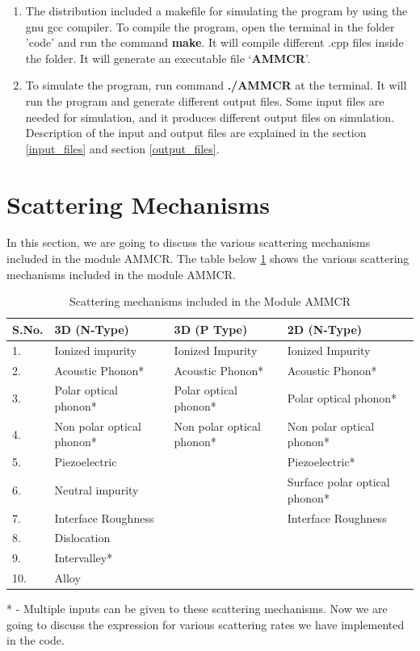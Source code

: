 \documentclass[12pt]{article}
\begin{document}
\begin{enumerate}
\item The distribution included a makefile for simulating the program by using the gnu gcc compiler.  To compile the program, open the terminal in the folder 'code' and run the command \textbf{make}. It will compile different .cpp files inside the folder. It will generate an executable file \lq \textbf{AMMCR}\rq .

\item To simulate the program, run command \textbf{./AMMCR} at the terminal. It will run the program and generate different output files. Some input files are needed for simulation, and it produces different output files on simulation. Description of the input and output files are explained in the section \ref{input_files} and section \ref{output_files}. 

\end{enumerate} 


\section{Scattering Mechanisms} \label{scattering}
In this section, we are going to discuss the various scattering mechanisms included in the module AMMCR. 
The table below \ref{scattering} shows the various scattering mechanisms included in the module AMMCR.

\begin{table} [H]
\caption{ Scattering mechanisms included in the Module AMMCR}
\label{scattering_table}
\begin{tabular}{|l|l|l|l|}
\hline
S.No. & 3D (N-Type) & 3D (P Type) & 2D (N-Type)   \\
\hline                                      
1. & Ionized impurity   &  Ionized Impurity & Ionized Impurity \\
\hline
2. & Acoustic Phonon*   &  Acoustic Phonon* &  Acoustic Phonon*  \\
\hline
3. & Polar optical phonon*    &  Polar optical phonon* &  Polar optical phonon* \\
\hline
4. & Non polar optical phonon*   &  Non polar optical phonon*  &  Non polar optical phonon* \\
\hline
5. & Piezoelectric & & Piezoelectric* \\
\hline
6. & Neutral impurity & & Surface polar optical phonon* \\
\hline
7. & Interface Roughness & & Interface Roughness \\
\hline
8. & Dislocation & & \\
\hline
9. & Intervalley* & & \\
\hline
10. & Alloy & & \\
\hline
\end{tabular}
\end{table}
* - Multiple inputs can be given to these scattering mechanisms.
Now we are going to discuss the expression for various scattering rates we have implemented in the code.
\end{document}
